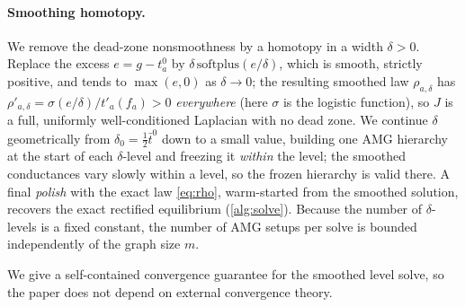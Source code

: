 \documentclass[ijoc]{informs3}
\begin{document}
\paragraph{Smoothing homotopy.}
We remove the dead-zone nonsmoothness by a homotopy in a width $\delta>0$. Replace the excess $e=g-t^0_a$ by
$\delta\,\mathrm{softplus}(e/\delta)$, which is smooth, strictly positive, and tends to $\max(e,0)$ as
$\delta\to0$; the resulting smoothed law $\rho_{a,\delta}$ has $\rho'_{a,\delta}=\sigma(e/\delta)/t'_a(f_a)>0$
\emph{everywhere} (here $\sigma$ is the logistic function), so $J$ is a full, uniformly well-conditioned
Laplacian with no dead zone. We continue $\delta$ geometrically from $\delta_0=\tfrac12\bar t^0$ down to a small
value, building one AMG hierarchy at the start of each $\delta$-level and freezing it \emph{within} the level;
the smoothed conductances vary slowly within a level, so the frozen hierarchy is valid there. A final
\emph{polish} with the exact law \cref{eq:rho}, warm-started from the smoothed solution, recovers the exact
rectified equilibrium (\cref{alg:solve}). Because the number of $\delta$-levels is a fixed constant, the number
of AMG setups per solve is bounded independently of the graph size $m$.

We give a self-contained convergence guarantee for the
smoothed level solve, so the paper does not depend on external convergence theory.
\end{document}
